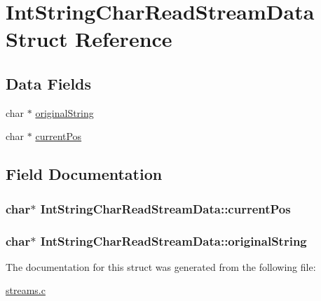 \hypertarget{structIntStringCharReadStreamData}{\section{Int\+String\+Char\+Read\+Stream\+Data Struct Reference}
\label{structIntStringCharReadStreamData}
}
\subsection*{Data Fields}
\begin{DoxyCompactItemize}
\item 
char $\ast$ \hyperlink{structIntStringCharReadStreamData_a68b0d508a17bbf4f6f684c8bba1c2d4d}{original\+String}
\item 
char $\ast$ \hyperlink{structIntStringCharReadStreamData_a101c53cb3a4ec8eb5a116af4e1e3ec56}{current\+Pos}
\end{DoxyCompactItemize}


\subsection{Field Documentation}
\hypertarget{structIntStringCharReadStreamData_a101c53cb3a4ec8eb5a116af4e1e3ec56}{
\subsubsection[{current\+Pos}]{\setlength{\rightskip}{0pt plus 5cm}char$\ast$ Int\+String\+Char\+Read\+Stream\+Data\+::current\+Pos}}\label{structIntStringCharReadStreamData_a101c53cb3a4ec8eb5a116af4e1e3ec56}
\hypertarget{structIntStringCharReadStreamData_a68b0d508a17bbf4f6f684c8bba1c2d4d}{
\subsubsection[{original\+String}]{\setlength{\rightskip}{0pt plus 5cm}char$\ast$ Int\+String\+Char\+Read\+Stream\+Data\+::original\+String}}\label{structIntStringCharReadStreamData_a68b0d508a17bbf4f6f684c8bba1c2d4d}


The documentation for this struct was generated from the following file\+:\begin{DoxyCompactItemize}
\item 
\hyperlink{streams_8c}{streams.\+c}\end{DoxyCompactItemize}
